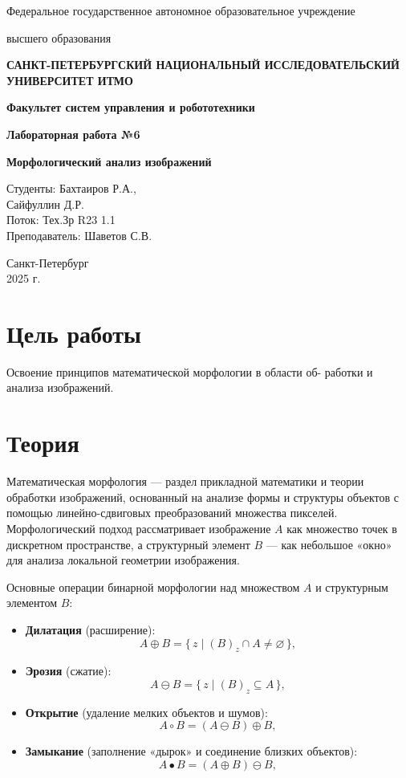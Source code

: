 \documentclass[a4paper,12pt]{article}
\begin{document}
    

\begin{titlepage}
    \centering
    {\large Федеральное государственное автономное образовательное учреждение\par}
    {\large высшего образования\par}
    {\bfseries САНКТ-ПЕТЕРБУРГСКИЙ НАЦИОНАЛЬНЫЙ ИССЛЕДОВАТЕЛЬСКИЙ УНИВЕРСИТЕТ ИТМО\par}
    {\bfseries Факультет систем управления и робототехники\par}
    \vfill
    {\Large \bfseries Лабораторная работа №6\par}
    {\Large \bfseries Морфологический анализ изображений\par}
    \vfill
    
    \begin{flushright}
        Студенты: Бахтаиров Р.А.,\\ 
        Сайфуллин Д.Р. \\
        Поток: Тех.Зр R23 1.1 \\
        Преподаватель: Шаветов С.В.
    \end{flushright}
    \vfill
    Санкт-Петербург\\
    2025 г.
\end{titlepage}

\tableofcontents
\newpage

\section{Цель работы}
Освоение принципов математической морфологии в области об-
работки и анализа изображений.

\section{Теория}
Математическая морфология — раздел прикладной математики и теории обработки изображений, основанный на анализе формы и структуры объектов с помощью линейно-сдвиговых преобразований множества пикселей. Морфологический подход рассматривает изображение \(A\) как множество точек в дискретном пространстве, а структурный элемент \(B\) — как небольшое «окно» для анализа локальной геометрии изображения.

Основные операции бинарной морфологии над множеством \(A\) и структурным элементом \(B\):
\begin{itemize}
  \item \textbf{Дилатация} (расширение): 
    \[
      A \oplus B = \{\,z \mid (B)_z \cap A \neq \varnothing \,\},
    \]
  \item \textbf{Эрозия} (сжатие):
    \[
      A \ominus B = \{\,z \mid (B)_z \subseteq A \,\},
    \]
  \item \textbf{Открытие} (удаление мелких объектов и шумов): 
    \[
      A \circ B = (A \ominus B) \oplus B,
    \]
  \item \textbf{Замыкание} (заполнение «дырок» и соединение близких объектов):
    \[
      A \bullet B = (A \oplus B) \ominus B,
    \]
\end{itemize}
\end{document}
